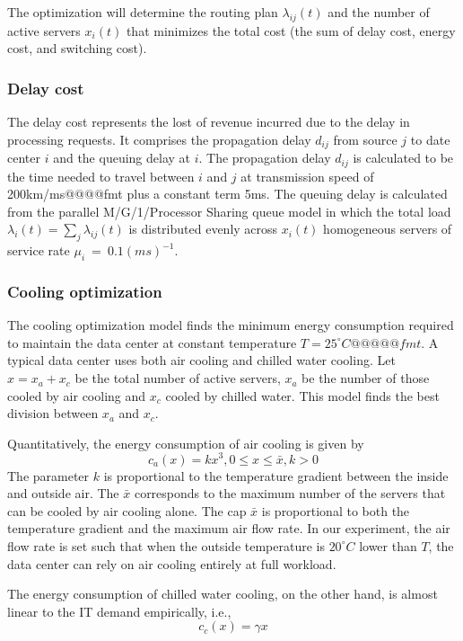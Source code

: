 \documentclass{acm_proc_article-sp}
\begin{document}
The optimization will determine the routing plan $\lambda_{ij}(t)$ and the number of active servers $x_i(t)$ that minimizes the total cost (the sum of delay cost, energy cost, and switching cost).

\subsubsection{Delay cost}
The delay cost represents the lost of revenue incurred due to the delay in processing requests. It comprises the propagation delay $d_{ij}$ from source $j$ to date center $i$ and the queuing delay at $i$.
The propagation delay $d_{ij}$ is calculated to be the time needed to travel between $i$ and $j$ at transmission speed of 200km/ms@@@@fmt plus a constant term 5ms. The queuing delay is calculated from the parallel M/G/1/Processor Sharing queue model in which the total load $\lambda_i(t)=\sum_j \lambda_{ij}(t)$ is distributed evenly across $x_i(t)$ homogeneous servers of service rate \mbox{$\mu_i$ = $0.1(ms)^{-1}$}.

\subsubsection{Cooling optimization}
The cooling optimization model finds the minimum energy consumption required to maintain the data center at constant temperature $T = 25^{\circ}C@@@@@fmt$. A typical data center uses both air cooling and chilled water cooling. Let $x = x_a + x_c$ be the total number of active servers, $x_a$ be the number of those cooled by air cooling and $x_c$ cooled by chilled water. This model finds the best division between $x_a$ and $x_c$. 

Quantitatively, the energy consumption of air cooling is given by 
\begin{equation}
c_a(x) = kx^3, 0 \leq x \leq \bar{x}, k > 0
\end{equation}
The parameter $k$ is proportional to the temperature gradient between the inside and outside air. The $\bar{x}$ corresponds to the maximum number of the servers that can be cooled by air cooling alone. The cap $\bar{x}$ is proportional to both the temperature gradient and the maximum air flow rate. In our experiment, the air flow rate is set such that when the outside temperature is $20^{\circ}C$ lower than $T$, the data center can rely on air cooling entirely at full workload.

The energy consumption of chilled water cooling, on the other hand, is almost linear to the IT demand empirically, i.e.,
\begin{equation}
c_c(x) = \gamma x
\end{equation}
\end{document}
